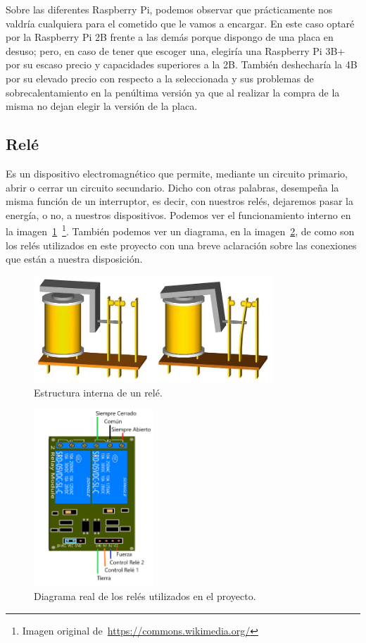 Sobre las diferentes Raspberry Pi, podemos observar que prácticamente nos valdría cualquiera para el cometido que le vamos a encargar. En este caso optaré por la Raspberry Pi 2B frente a las demás porque dispongo de una placa en desuso; pero, en caso de tener que escoger una, elegiría una Raspberry Pi 3B+ por su escaso precio y capacidades superiores a la 2B. También deshecharía la 4B por su elevado precio con respecto a la seleccionada y sus problemas de sobrecalentamiento en la penúltima versión ya que al realizar la compra de la misma no dejan elegir la versión de la placa.\\

\subsection{Relé}\label{4:Relé}
Es un dispositivo electromagnético que permite, mediante un circuito primario, abrir o cerrar un circuito secundario. Dicho con otras palabras, desempeña la misma función de un interruptor, es decir, con nuestros relés, dejaremos pasar la energía, o no, a nuestros dispositivos. Podemos ver el funcionamiento interno en la imagen~\ref{Img:Rele1}~\footnote{Imagen original de~\url{https://commons.wikimedia.org/}}. También podemos ver un diagrama, en la imagen~\ref{Img:ReleProyecto}, de como son los relés utilizados en este proyecto con una breve aclaración sobre las conexiones que están a nuestra disposición.
\begin{figure}[h]
    \centering
    \includegraphics[width=0.8\textwidth]{img/Rele_1.jpg}
    \caption{Estructura interna de un relé.} \label{Img:Rele1}
\end{figure}
\begin{figure}[h]
    \centering
    \includegraphics[width=0.4\textwidth]{img/Diagramas/ReleProyecto.png}
    \caption{Diagrama real de los relés utilizados en el proyecto.} \label{Img:ReleProyecto}
\end{figure}

